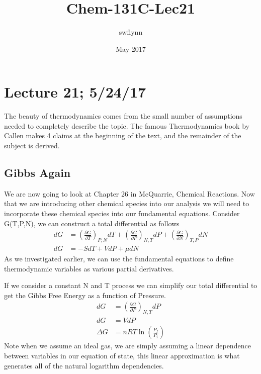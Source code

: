\documentclass{article}
\title{Chem-131C-Lec21}
\author{swflynn}
\date{May 2017}
\begin{document}
\maketitle

\section*{Lecture 21; 5/24/17}
The beauty of thermodynamics comes from the small number of assumptions needed to completely describe the topic.
The famous Thermodynamics book by Callen makes 4 claims at the beginning of the text, and the remainder of the subject is derived. 

\subsection*{Gibbs Again}
We are now going to look at Chapter 26 in McQuarrie, Chemical Reactions. 
Now that we are introducing other chemical species into our analysis we will need to incorporate these chemical species into our fundamental equations. 
Consider G(T,P,N), we can construct a total differential as follows
\begin{equation}
\begin{split}
dG &= \left(\frac{\partial G}{\partial T}\right)_{P,N}dT +  \left(\frac{\partial G}{\partial P}\right)_{N,T}dP + \left(\frac{\partial G}{\partial N}\right)_{T,P}dN \\
dG &= -SdT + VdP + \mu dN
\end{split}
\end{equation}
As we investigated earlier, we can use the fundamental equations to define thermodynamic variables as various partial derivatives.

If we consider a constant N and T process we can simplify our total differential to get the Gibbs Free Energy as a function of Pressure. 
\begin{equation}
\begin{split}
    dG &= \left(\frac{\partial G}{\partial P}\right)_{N,T}dP\\
    dG &= VdP\\
    \Delta G &= nRT \ln \left(\frac{P_f}{P_i}\right)
    \end{split}
\end{equation}
Note when we assume an ideal gas, we are simply assuming a linear dependence between variables in our equation of state, this linear approximation is what generates all of the natural logarithm dependencies. 
\end{document}
